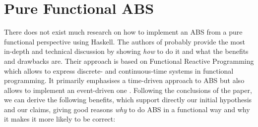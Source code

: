 \section{Pure Functional ABS}
\label{sec:pfABS}

There does not exist much research on how to implement an ABS from a pure functional perspective using Haskell. The authors of \cite{thaler_pure_2019} probably provide the most in-depth and technical discussion by showing \textit{how} to do it and what the benefits and drawbacks are. Their approach is based on Functional Reactive Programming which allows to express discrete- and continuous-time systems in functional programming. It primarily emphasises a time-driven approach to ABS but also allows to implement an event-driven one \cite{meyer_event-driven_2014}. Following the conclusions of the paper, we can derive the following benefits, which  support directly our initial hypothesis and our claims, giving good reasons \textit{why} to do ABS in a functional way and why it makes it more likely to be correct:


